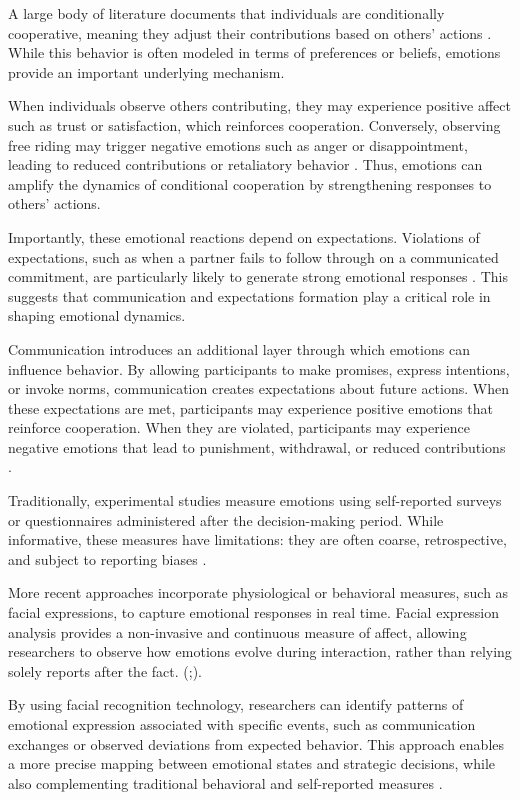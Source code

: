 \documentclass[12pt,letterpaper,english]{article}
\begin{document}
A large body of literature documents that individuals are conditionally cooperative, meaning they adjust their contributions based on others’ actions \cite{Fischbacher2001}. While this behavior is often modeled in terms of preferences or beliefs, emotions provide an important underlying mechanism.

When individuals observe others contributing, they may experience positive affect such as trust or satisfaction, which reinforces cooperation. Conversely, observing free riding may trigger negative emotions such as anger or disappointment, leading to reduced contributions or retaliatory behavior \cite{Pillutla1996}. Thus, emotions can amplify the dynamics of conditional cooperation by strengthening responses to others’ actions.

Importantly, these emotional reactions depend on expectations. Violations of expectations, such as when a partner fails to follow through on a communicated commitment, are particularly likely to generate strong emotional responses \cite{Charness2006}. This suggests that communication and expectations formation play a critical role in shaping emotional dynamics.

Communication introduces an additional layer through which emotions can influence behavior. By allowing participants to make promises, express intentions, or invoke norms, communication creates expectations about future actions. When these expectations are met, participants may experience positive emotions that reinforce cooperation. When they are violated, participants may experience negative emotions that lead to punishment, withdrawal, or reduced contributions \cite{Fehr2002}.

Traditionally, experimental studies measure emotions using self-reported surveys or questionnaires administered after the decision-making period. While informative, these measures have limitations: they are often coarse, retrospective, and subject to reporting biases \cite{Mauss2009}.

More recent approaches incorporate physiological or behavioral measures, such as facial expressions, to capture emotional responses in real time. Facial expression analysis provides a non-invasive and continuous measure of affect, allowing researchers to observe how emotions evolve during interaction, rather than relying solely reports after the fact. (\cite{Ekman1992};\cite{Lewinski2014}).

By using facial recognition technology, researchers can identify patterns of emotional expression associated with specific events, such as communication exchanges or observed deviations from expected behavior. This approach enables a more precise mapping between emotional states and strategic decisions, while also complementing traditional behavioral and self-reported measures \cite{Barrett2019}.
\end{document}
